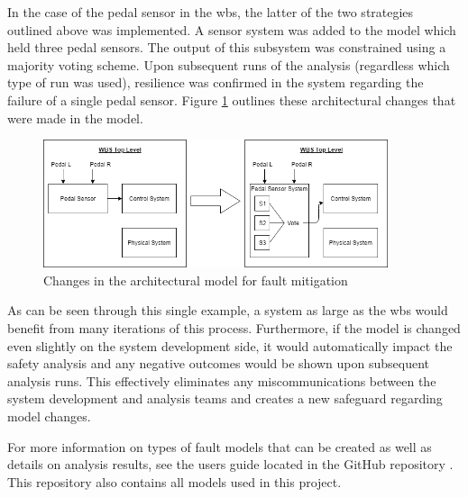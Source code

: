 In the case of the pedal sensor in the \gls{wbs}, the latter of the two strategies outlined above was implemented. A sensor system was added to the model which held three pedal sensors. The output of this subsystem was constrained using a majority voting scheme. Upon subsequent runs of the analysis (regardless which type of run was used), resilience was confirmed in the system regarding the failure of a single pedal sensor. Figure \ref{fig:sensorsystem} outlines these architectural changes that were made in the model.

\begin{figure}[h!]
	\begin{centering}
		\includegraphics[width=0.9\textwidth]{images/sensorsystem.png}
	\caption{Changes in the architectural model for fault mitigation}
	\label{fig:sensorsystem}
	\end{centering}
\end{figure}

As can be seen through this single example, a system as large as the \gls{wbs} would benefit from many iterations of this process. Furthermore, if the model is changed even slightly on the system development side, it would automatically impact the safety analysis and any negative outcomes would be shown upon subsequent analysis runs. This effectively eliminates any miscommunications between the system development and analysis teams and creates a new safeguard regarding model changes. 

For more information on types of fault models that can be created as well as details on analysis results, see the users guide located in the GitHub repository \cite{SAGithub}. This repository also contains all models used in this project. 


